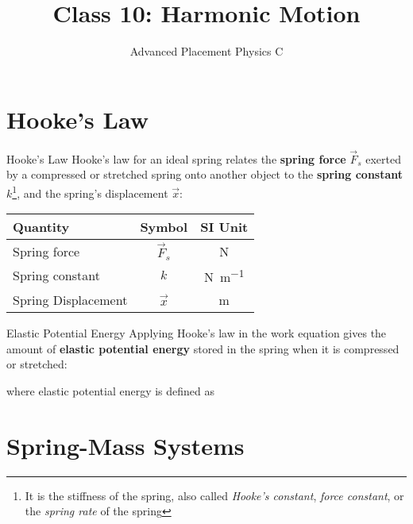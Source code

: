 \documentclass[12pt,compress,aspectratio=169]{beamer}
\title{Class 10: Harmonic Motion}
\subtitle{Advanced Placement Physics C}
\begin{document}
\begin{frame}
  \maketitle
\end{frame}


\section{Hooke's Law}

\begin{frame}{Hooke's Law}
  Hooke's law for an ideal spring relates the \textbf{spring force} $\vec F_s$
  exerted by a compressed or stretched spring onto another object to the
  \textbf{spring constant} $k$\footnote{It is the stiffness of the spring, also
  called \emph{Hooke's constant}, \emph{force constant}, or the \emph{spring
  rate} of the spring}, and the spring's displacement $\vec x$:

  \begin{center}
    \begin{tabular}{l|c|c}
      \rowcolor{pink}
      \textbf{Quantity} & \textbf{Symbol} & \textbf{SI Unit} \\ \hline
      Spring force        & $\vec F_s$ & \si\newton \\
      Spring constant     & $k$        & \si{\newton\per\metre}\\
      Spring Displacement & $\vec x$   & \si\metre
    \end{tabular}
  \end{center}
  \vspace{.3in}
\end{frame}



\begin{frame}{Elastic Potential Energy}
  Applying Hooke's law in the work equation gives the amount of \textbf{elastic
    potential energy} stored in the spring when it is compressed or stretched:


  where elastic potential energy is defined as

\end{frame}



\section{Spring-Mass Systems}
\end{document}
